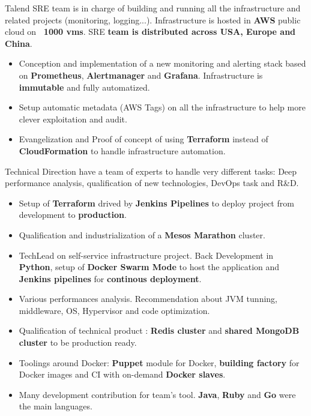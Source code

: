 \documentclass[10pt,a4paper,ragged2e]{altacv}
\begin{document}
		Talend SRE team is in charge of building and running all the infrastructure and related projects (monitoring, logging...). Infrastructure is hosted in \textbf{AWS} public cloud on\textbf{ ~1000 vms}. SRE \textbf{team is distributed across USA, Europe and China}.
	
		\medskip
		\begin{itemize}
			\item Conception and implementation of a new monitoring and alerting stack based on \textbf{Prometheus}, \textbf{Alertmanager} and \textbf{Grafana}. Infrastructure is \textbf{immutable} and fully automatized.
			\item Setup automatic metadata (AWS Tags) on all the infrastructure to help more clever exploitation and audit.
			\item Evangelization and Proof of concept of using \textbf{Terraform} instead of \textbf{CloudFormation} to handle infrastructure automation.
		\end{itemize}
	\divider

	
		Technical Direction have a team of experts to handle very different tasks: Deep performance analysis, qualification of new technologies, DevOps task and R\&D.
		
		\medskip
		\begin{itemize}
			\item Setup of \textbf{Terraform} drived by \textbf{Jenkins Pipelines} to deploy project from development to \textbf{production}.
			\item Qualification and industrialization of a\textbf{ Mesos Marathon} cluster.
			\item TechLead on self-service infrastructure project. Back Development in \textbf{Python}, setup of \textbf{Docker Swarm Mode} to host the application and \textbf{Jenkins pipelines} for \textbf{continous deployment}.
			\item Various performances analysis. Recommendation about JVM tunning, middleware, OS, Hypervisor and code optimization.
			\item Qualification of technical product : \textbf{Redis cluster} and \textbf{shared MongoDB cluster} to be production ready.
			\item Toolings around Docker: \textbf{Puppet} module for Docker, \textbf{building factory} for Docker images and CI with on-demand \textbf{Docker slaves}.
			\item Many development contribution for team's tool. \textbf{Java}, \textbf{Ruby} and \textbf{Go} were the main languages.
		\end{itemize}
	\divider
\end{document}

